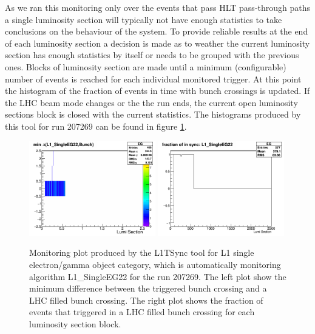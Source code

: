 As we ran this monitoring only over the events that pass \gls{HLT} pass-through paths a single luminosity section will typically not have enough statistics to take conclusions on the behaviour of the system. To provide reliable results at the end of each luminosity section a decision is made as to weather the current luminosity section has enough statistics by itself or needs to be grouped with the previous ones. Blocks of luminosity section are made until a minimum (configurable) number of events is reached for each individual monitored trigger. At this point the histogram of the fraction of events in time with bunch crossings is updated. If the \gls{LHC} beam mode changes or the the run ends, the current open luminosity sections block is closed with the current statistics. The histograms produced by this tool for run 207269 can be found in figure \ref{FIGURE:TechnicalWork_SyncMonitoring}.

\begin{figure}[!htb]
\centering
\includegraphics[width=0.49\textwidth]{Chapter03/L1TOnline/Images/L1TDQM_Online_Run207269_L1TSync_AlgoVsBunchStructure_EG.png}
\includegraphics[width=0.49\textwidth]{Chapter03/L1TOnline/Images/L1TDQM_Online_Run207269_L1TSync_Certification_EG.png}
\caption{Monitoring plot produced by the L1TSync tool for L1 single electron/gamma object category, which is
automatically monitoring algorithm L1\_SingleEG22 for the run 207269. The left plot show the minimum difference between the triggered bunch crossing and a \gls{LHC} filled bunch crossing. The right plot shows the fraction of events that triggered in a \gls{LHC} filled bunch crossing for each luminosity section block.}
\label{FIGURE:TechnicalWork_SyncMonitoring}
\end{figure}

